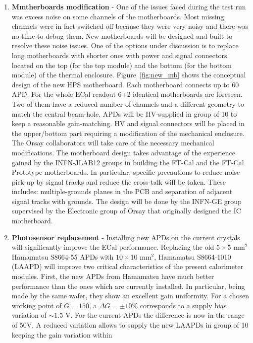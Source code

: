 \documentclass[11pt]{report}
\begin{document}
\begin{enumerate}
    
\item {\bf Mmtherboards modification} - One of the issues  faced during the test run was excess noise on some channels of the motherboards. 
Most missing channels were in fact switched off because they were very noisy and there was no time to debug them. 
New motherboards will be designed and built to resolve these noise issues. One of the options under discussion is to replace long motherboards with shorter ones with power and signal connectors 
located on the top (for the top module) and the bottom (for the bottom module) of the thermal enclosure. 
Figure~\ref{fig:new_mb} shows the conceptual design of the new HPS motherboard. Each motherboard connects up to 60 APD. For the whole ECal readout 6+2 identical motherboards are foreseen. 
Two of them have a reduced number of channels and a different geometry to match the central beam-hole. APDs will be HV-supplied in group of 10 to keep a reasonable gain-matching. 
HV and signal connectors will be placed in the upper/bottom part requiring a modification of the mechanical enclosure. The Orsay collaborators will take care of the necessary mechanical modifications.
The motherboard design takes advantage of the experience gained by the INFN-JLAB12 groups in building the FT-Cal and the FT-Cal Prototype motherboards.
In particular, specific precautions to reduce noise pick-up by signal tracks and reduce the cross-talk will be taken. These includes: multiple-grounds planes in the PCB and separation of adjacent signal tracks with grounds.
The design will be done by the INFN-GE group supervised by the Electronic group of Orsay that originally designed the IC motherboard.
\item {\bf  Photosensor replacement} - Installing new APDs on the current crystals will significantly improve the ECal performance. Replacing the old $5\times 5$ mm$^2$ 
Hamamatsu S8664-55 APDs with $10\times 10$ mm$^2$, Hamamatsu S8664-1010 (LAAPD) will improve two critical characteristics of the present calorimeter modules. 
First, the new APDs from Hamamatsu have much better performance than the ones which are currently installed. In particular, being made by the same wafer, they 
show an excellent gain uniformity. For a chosen working point of $G=150$, a $\Delta G=\pm 10\%$ corresponds to a supply bias variation of  $\sim 1.5$ V.
For the current APDs the difference is now in the range of 50V. A reduced variation allows to supply the new LAAPDs in group of 10 keeping the gain variation within 

\end{enumerate}
\end{document}
